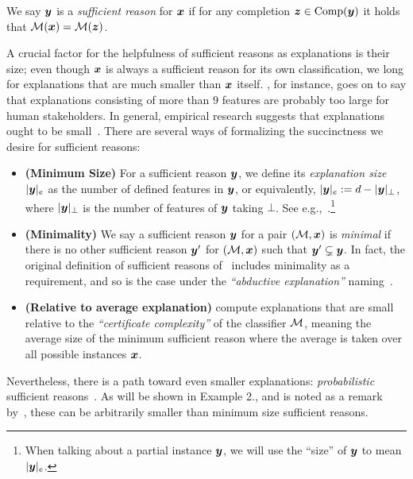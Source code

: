 \begin{definition}
	We say ${\bm{y}}$ is a \emph{sufficient reason} for ${\bm{x}}$ if for any completion ${\bm{z}} \in \operatorname{Comp}({\bm{y}})$ it holds that $\mathcal{M}({\bm{x}}) = \mathcal{M}({\bm{z}})$.
	\label{def:sufficient-reason}
\end{definition}
A crucial factor for the helpfulness of sufficient reasons as explanations is their size; even though ${\bm{x}}$ is always a sufficient reason for its own classification, we long for explanations that are much smaller than ${\bm{x}}$ itself. \citet{millerMagicalNumberSeven1956}, for instance, goes on to say that explanations consisting of more than $9$ features are probably too large for human stakeholders. In general, empirical research suggests that explanations ought to be small~\cite{Narayanan_Chen_He_Kim_Gershman_Doshi-Velez_2018, Lage_Chen_He_Narayanan_Kim_Gershman_Doshi-Velez_2019}.
There are several ways of formalizing the succinctness we desire for sufficient reasons:

\begin{itemize}
    \item \textbf{(Minimum Size)} For a sufficient reason ${\bm{y}}$, we define its \emph{explanation size} $|{\bm{y}}|_e$ as the number of defined features in ${\bm{y}}$, or equivalently, $|{\bm{y}}|_e := d - |{\bm{y}}|_\bot$, where $|{\bm{y}}|_\bot$ is the number of features of ${\bm{y}}$ taking $\bot$. See e.g.,~\cite{NEURIPS2020_b1adda14}.\footnote{When talking about a partial instance ${\bm{y}}$, we will use the ``size'' of ${\bm{y}}$ to mean $|{\bm{y}}|_e$.}
    \item \textbf{(Minimality)} We say a sufficient reason ${\bm{y}}$ for a pair $(\mathcal{M}, {\bm{x}})$ is \emph{minimal} if there is no other sufficient reason ${\bm{y}}'$ for $(\mathcal{M}, {\bm{x}})$ such that ${\bm{y}}' \subsetneq {\bm{y}}$. In fact, the original definition of sufficient reasons of~\citet{Darwiche_Hirth_2020} includes minimality as a requirement, and so is the case under the \emph{``abductive explanation''} naming~\cite{Ignatiev_Narodytska_Asher_Marques-Silva_2021}.
    \item \textbf{(Relative to average explanation)} \citet{blanc2021provably} compute explanations that are small relative to the \emph{``certificate complexity''} of the classifier $\mathcal{M}$, meaning the average size of the minimum sufficient reason where the average is taken over all possible instances ${\bm{x}}$.
\end{itemize}

Nevertheless, there is a path toward even smaller explanations: \emph{probabilistic} sufficient reasons~\cite{Waldchen_MacDonald_Hauch_Kutyniok_2021, Izza_Huang_Ignatiev_Narodytska_Cooper_Marques-Silva_2023}. 
As will be shown in Example 2., and is noted as a remark by~\citet{blanc2021provably}, these can be arbitrarily smaller than minimum size sufficient reasons.
